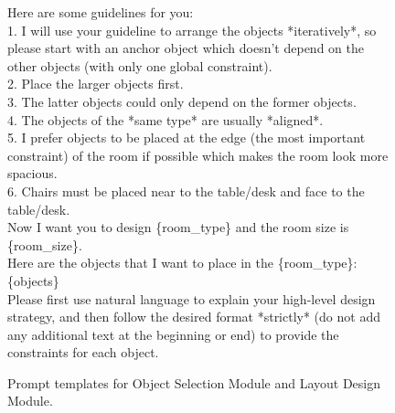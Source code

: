 \begin{figure}[!t]
\begin{center}
\begin{tcolorbox} [top=2pt,bottom=2pt, width=\linewidth, boxrule=1pt]
{{    Here are some guidelines for you: \\
    1. I will use your guideline to arrange the objects *iteratively*, so please start with an anchor object which doesn't depend on the other objects (with only one global constraint). \\
    2. Place the larger objects first. \\
    3. The latter objects could only depend on the former objects. \\
    4. The objects of the *same type* are usually *aligned*. \\
    5. I prefer objects to be placed at the edge (the most important constraint) of the room if possible which makes the room look more spacious. \\
    6. Chairs must be placed near to the table/desk and face to the table/desk. \\
    Now I want you to design \{room\_type\} and the room size is \{room\_size\}. \\
    Here are the objects that I want to place in the \{room\_type\}:
    \{objects\} \\
    Please first use natural language to explain your high-level design strategy, and then follow the desired format *strictly* (do not add any additional text at the beginning or end) to provide the constraints for each object.
    }
    \par}
    \end{tcolorbox}
    
    \end{center}
    \caption{Prompt templates for Object Selection Module and Layout Design Module.}
    \label{fig:prompt-2}
    \vspace{-.3cm}
\end{figure}



